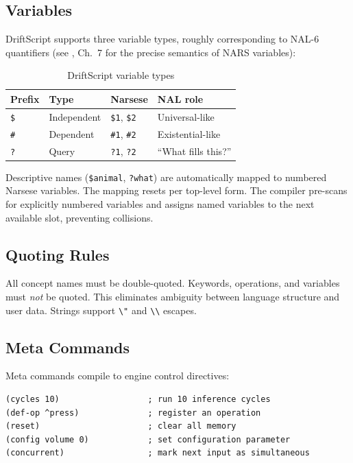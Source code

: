 \documentclass[11pt,a4paper]{article}
\begin{document}
\subsection{Variables}

DriftScript supports three variable types, roughly corresponding to NAL-6
quantifiers (see \citet{wang2013non}, Ch.~7 for the precise semantics of NARS
variables):

\begin{table}[h]
\centering
\caption{DriftScript variable types}
\label{tab:vars}
\begin{tabular}{llll}
\toprule
\textbf{Prefix} & \textbf{Type} & \textbf{Narsese} & \textbf{NAL role} \\
\midrule
\texttt{\$} & Independent & \texttt{\$1}, \texttt{\$2} & Universal-like \\
\texttt{\#} & Dependent & \texttt{\#1}, \texttt{\#2} & Existential-like \\
\texttt{?} & Query & \texttt{?1}, \texttt{?2} & ``What fills this?'' \\
\bottomrule
\end{tabular}
\end{table}

Descriptive names (\texttt{\$animal}, \texttt{?what}) are automatically mapped
to numbered Narsese variables. The mapping resets per top-level form. The
compiler pre-scans for explicitly numbered variables and assigns named
variables to the next available slot, preventing collisions.

\subsection{Quoting Rules}

All concept names must be double-quoted. Keywords, operations, and variables
must \emph{not} be quoted. This eliminates ambiguity between language structure
and user data. Strings support \texttt{\textbackslash"} and
\texttt{\textbackslash\textbackslash} escapes.

\subsection{Meta Commands}

Meta commands compile to engine control directives:

\begin{lstlisting}[language=DriftScript]
(cycles 10)                  ; run 10 inference cycles
(def-op ^press)              ; register an operation
(reset)                      ; clear all memory
(config volume 0)            ; set configuration parameter
(concurrent)                 ; mark next input as simultaneous
\end{lstlisting}
\end{document}

